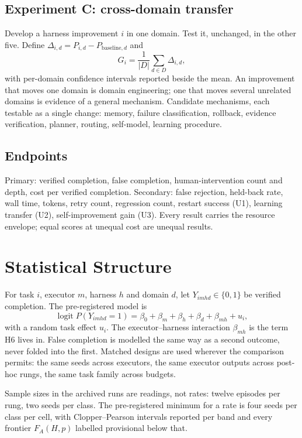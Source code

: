 \documentclass[11pt]{article}
\theoremstyle{definition}
\begin{document}
\subsection{Experiment C: cross-domain transfer}

Develop a harness improvement $i$ in one domain. Test it, unchanged, in the other five. Define $\Delta_{i,d} = P_{i,d} - P_{\text{baseline},d}$ and
\[
G_i = \frac{1}{|D|}\sum_{d \in D} \Delta_{i,d},
\]
with per-domain confidence intervals reported beside the mean. An improvement that moves one domain is domain engineering; one that moves several unrelated domains is evidence of a general mechanism. Candidate mechanisms, each testable as a single change: memory, failure classification, rollback, evidence verification, planner, routing, self-model, learning procedure.

\subsection{Endpoints}

Primary: verified completion, false completion, human-intervention count and depth, cost per verified completion. Secondary: false rejection, held-back rate, wall time, tokens, retry count, regression count, restart success (U1), learning transfer (U2), self-improvement gain (U3). Every result carries the resource envelope; equal scores at unequal cost are unequal results.

\section{Statistical Structure}\label{sec:stats}

For task $i$, executor $m$, harness $h$ and domain $d$, let $Y_{imhd} \in \{0,1\}$ be verified completion. The pre-registered model is
\[
\operatorname{logit} P(Y_{imhd} = 1) = \beta_0 + \beta_m + \beta_h + \beta_d + \beta_{mh} + u_i,
\]
with a random task effect $u_i$. The executor--harness interaction $\beta_{mh}$ is the term H6 lives in. False completion is modelled the same way as a second outcome, never folded into the first. Matched designs are used wherever the comparison permits: the same seeds across executors, the same executor outputs across post-hoc rungs, the same task family across budgets.

Sample sizes in the archived runs are readings, not rates: twelve episodes per rung, two seeds per class. The pre-registered minimum for a rate is four seeds per class per cell, with Clopper--Pearson intervals reported per band and every frontier $F_A(H,p)$ labelled provisional below that.
\end{document}
